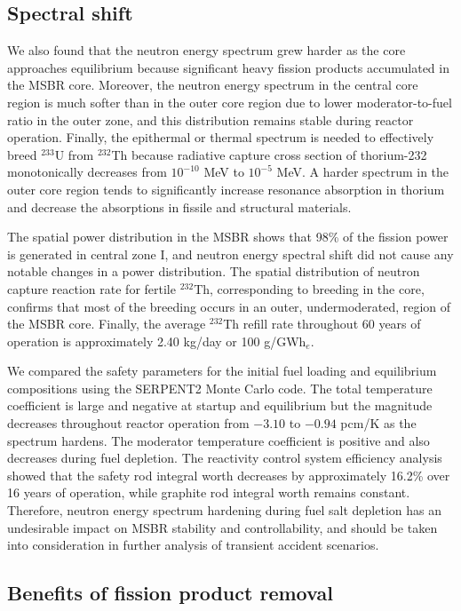 \subsection{Spectral shift}
We also found that the neutron energy spectrum grew harder as the core  
approaches equilibrium because significant heavy fission products accumulated in 
the \gls{MSBR} core. Moreover, the neutron energy spectrum in the central core 
region is much softer than in the outer core region due to lower 
moderator-to-fuel ratio in the outer zone, and this distribution remains stable 
during reactor operation. Finally, the epithermal or thermal spectrum is needed 
to effectively breed $^{233}$U from $^{232}$Th because radiative capture cross 
section of thorium-232 monotonically decreases from $10^{-10}$ MeV to $10^{-5}$ 
MeV. A harder spectrum in the outer core region tends to significantly increase 
resonance absorption in thorium and decrease the absorptions in fissile and 
structural materials. 

The spatial power distribution in the \gls{MSBR} shows that 98\% of the fission 
power is generated in central zone I, and neutron energy spectral shift did not 
cause any notable changes in a power distribution. The spatial distribution of 
neutron capture reaction rate for fertile $^{232}$Th, corresponding to breeding in 
the core, confirms that most of the breeding occurs in an outer, 
undermoderated, region of the \gls{MSBR} core. Finally, the average $^{232}$Th 
refill rate throughout 60 years of operation is approximately 2.40 kg/day or 
100 g/GWh$_e$.

We compared the safety parameters for the initial fuel loading and 
equilibrium compositions using the SERPENT2 Monte Carlo code. 
The total temperature coefficient 
is large and negative at startup and equilibrium but the magnitude decreases 
throughout reactor operation from $-3.10$ to $-0.94$ pcm/K as the spectrum 
hardens. The moderator 
temperature coefficient is positive and also decreases during fuel depletion. 
The reactivity control system efficiency analysis showed that the safety rod integral 
worth decreases by approximately 16.2\% over 16 years of operation, while 
graphite rod integral worth remains constant. Therefore, neutron energy 
spectrum hardening during fuel salt depletion has an undesirable impact on 
\gls{MSBR} stability and controllability, and should be taken into 
consideration in further analysis of transient accident scenarios.

\subsection{Benefits of fission product removal}

